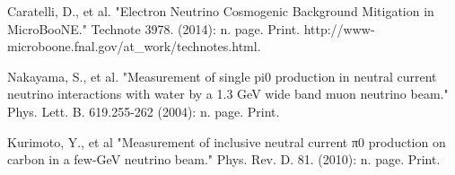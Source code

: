 \documentclass[12pt]{article}
\begin{document}
\begin{thebibliography}{20}
Caratelli, D., et al. "Electron Neutrino Cosmogenic Background Mitigation in MicroBooNE." Technote 3978. (2014): n. page. Print. http://www-microboone.fnal.gov/at\_work/technotes.html.

Nakayama, S., et al. "Measurement of single pi0 production in neutral current neutrino interactions with water by a 1.3 GeV wide band muon neutrino beam." Phys. Lett. B. 619.255-262 (2004): n. page. Print.

Kurimoto, Y., et al "Measurement of inclusive neutral current π0 production on carbon in a few-GeV neutrino beam." Phys. Rev. D. 81. (2010): n. page. Print.

\end{thebibliography}
\end{document}
